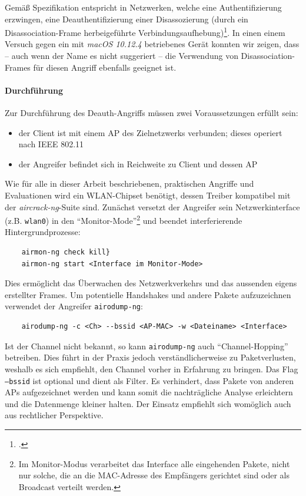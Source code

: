 Gemäß Spezifikation entspricht in Netzwerken, welche eine Authentifizierung erzwingen, eine Deauthentifizierung einer Disassozierung (durch ein Disassociation-Frame herbeigeführte Verbindungsaufhebung)\footcite[S. 74, S. 442]{ieee802.11}. In einen einem Versuch gegen ein mit \textit{macOS 10.12.4} betriebenes Gerät konnten wir zeigen, dass -- auch wenn der Name es nicht suggeriert -- die Verwendung von Disassociation-Frames für diesen Angriff ebenfalls geeignet ist.

\paragraph{Durchführung}
Zur Durchführung des Deauth-Angriffs müssen zwei Voraussetzungen erfüllt sein: 
\begin{itemize}
	\item der Client ist mit einem AP des Zielnetzwerks verbunden; dieses operiert nach IEEE 802.11
	\item der Angreifer befindet sich in Reichweite zu Client und dessen AP
\end{itemize}

Wie für alle in dieser Arbeit beschriebenen, praktischen Angriffe und Evaluationen wird ein WLAN-Chipset benötigt, dessen Treiber kompatibel mit der \textit{aircrack-ng}-Suite sind. 
Zunächst versetzt der Angreifer sein Netzwerkinterface (z.B. \texttt{wlan0}) in den \enquote{Monitor-Mode}\footnote{Im Monitor-Modus verarbeitet das Interface alle eingehenden Pakete, nicht nur solche, die an die MAC-Adresse des Empfängers gerichtet sind oder als Broadcast verteilt werden.} und beendet interferierende Hintergrundprozesse:

\begin{Verbatim}
	airmon-ng check kill}
	airmon-ng start <Interface im Monitor-Mode>
\end{Verbatim}

Dies ermöglicht das Überwachen des Netzwerkverkehrs und das aussenden eigens erstellter Frames.
Um potentielle Handshakes und andere Pakete aufzuzeichnen verwendet der Angreifer \texttt{airodump-ng}:
\begin{Verbatim}
	airodump-ng -c <Ch> --bssid <AP-MAC> -w <Dateiname> <Interface>
\end{Verbatim}
Ist der Channel nicht bekannt, so kann \texttt{airodump-ng} auch \enquote{Channel-Hopping} betreiben. 
Dies führt in der Praxis jedoch verständlicherweise zu Paketverlusten, weshalb es sich empfiehlt, den Channel vorher in Erfahrung zu bringen. Das Flag \texttt{--bssid} ist optional und dient als Filter. Es verhindert, dass Pakete von anderen APs aufgezeichnet werden und kann somit die nachträgliche Analyse erleichtern und die Datenmenge kleiner halten. Der Einsatz empfiehlt sich womöglich auch aus rechtlicher Perspektive.


